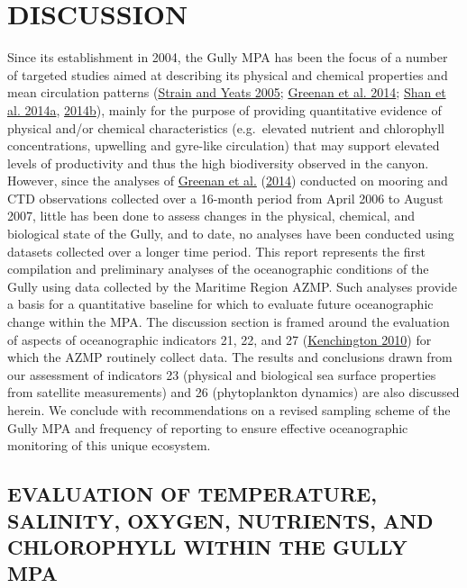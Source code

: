 \documentclass[12pt]{article}\usepackage[]{graphicx}\usepackage[]{color}
\begin{document}
\clearpage

\hypertarget{sec:discussion}{%
\section{DISCUSSION}\label{sec:discussion}}

Since its establishment in 2004, the Gully MPA has been the focus of a number of targeted studies aimed at describing its physical and chemical properties and mean circulation patterns (\protect\hyperlink{ref-strain_2005}{Strain and Yeats 2005}; \protect\hyperlink{ref-greenan_2014}{Greenan et al. 2014}; \protect\hyperlink{ref-shan_2014a}{Shan et al. 2014a}, \protect\hyperlink{ref-shan_2014b}{2014b}), mainly for the purpose of providing quantitative evidence of physical and/or chemical characteristics (e.g.~elevated nutrient and chlorophyll concentrations, upwelling and gyre-like circulation) that may support elevated levels of productivity and thus the high biodiversity observed in the canyon. However, since the analyses of \protect\hyperlink{ref-greenan_2014}{Greenan et al.} (\protect\hyperlink{ref-greenan_2014}{2014}) conducted on mooring and CTD observations collected over a 16-month period from April 2006 to August 2007, little has been done to assess changes in the physical, chemical, and biological state of the Gully, and to date, no analyses have been conducted using datasets collected over a longer time period. This report represents the first compilation and preliminary analyses of the oceanographic conditions of the Gully using data collected by the Maritime Region AZMP. Such analyses provide a basis for a quantitative baseline for which to evaluate future oceanographic change within the MPA. The discussion section is framed around the evaluation of aspects of oceanographic indicators 21, 22, and 27 (\protect\hyperlink{ref-kenchington_2010}{Kenchington 2010}) for which the AZMP routinely collect data. The results and conclusions drawn from our assessment of indicators 23 (physical and biological sea surface properties from satellite measurements) and 26 (phytoplankton dynamics) are also discussed herein. We conclude with recommendations on a revised sampling scheme of the Gully MPA and frequency of reporting to ensure effective oceanographic monitoring of this unique ecosystem.

\hypertarget{evaluation-of-temperature-salinity-oxygen-nutrients-and-chlorophyll-within-the-gully-mpa}{%
\subsection{\texorpdfstring{\textbf{EVALUATION OF TEMPERATURE, SALINITY, OXYGEN, NUTRIENTS, AND CHLOROPHYLL WITHIN THE GULLY MPA}}{EVALUATION OF TEMPERATURE, SALINITY, OXYGEN, NUTRIENTS, AND CHLOROPHYLL WITHIN THE GULLY MPA}}\label{evaluation-of-temperature-salinity-oxygen-nutrients-and-chlorophyll-within-the-gully-mpa}}
\end{document}
